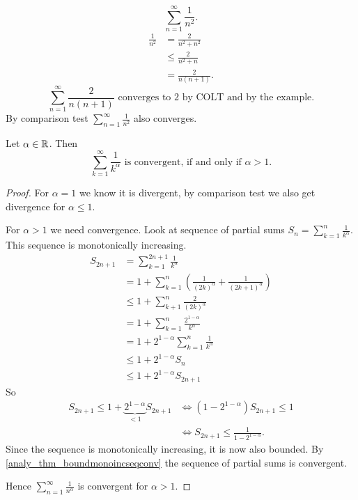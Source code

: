 \documentclass[10pt, a4paper]{article}
\newcommand{\infsum}[1][k = 1]{\sum_{#1}^{\infty}}
\begin{document}
\begin{example}
    \[
    \infsum[n = 1]\frac{1}{n ^ 2}.
    \]
    \begin{align*}
        \frac{1}{n ^ 2} &= \frac{2}{n ^ 2 + n ^ 2} \\
        &\leq \frac{2}{n ^ 2 + n} \\
        &= \frac{2}{n(n + 1)}.
    \end{align*}
    \[
    \infsum[n = 1]\frac{2}{n(n + 1)}\text{ converges to $2$ by COLT and by the example}.
    \]
    By comparison test $\infsum[n = 1]\frac{1}{n ^ 2}$ also converges.
\end{example}

\begin{theorem}
    Let $\alpha \in \mathbb{R}$.
    Then
    \[
    \infsum\frac{1}{k ^ \alpha}\text{ is convergent, if and only if $\alpha > 1$}.
    \]
    \begin{proof}
        For $\alpha = 1$ we know it is divergent,
        by comparison test we also get divergence for $\alpha \leq 1$.

        For $\alpha > 1$ we need convergence.
        Look at sequence of partial sums $\displaystyle S_n = \sum_{k = 1}^{n}\frac{1}{k ^ \alpha}$.
        This sequence is monotonically increasing.
        \begin{align*}
            S_{2n + 1} &= \sum_{k = 1}^{2n + 1}\frac{1}{k ^ \alpha} \\
            &= 1 + \sum_{k = 1}^{n}\left(\frac{1}{(2k) ^ \alpha} + \frac{1}{(2k + 1) ^ \alpha}\right) \\
            &\leq 1 + \sum_{k + 1}^{n}\frac{2}{(2k) ^ \alpha} \\
            &= 1 + \sum_{k = 1}^{n}\frac{2 ^ {1 - \alpha}}{k ^ \alpha} \\
            &= 1 + 2 ^ {1 - \alpha}\sum_{k = 1}^{n}\frac{1}{k ^ \alpha} \\
            &\leq 1 + 2 ^ {1 - \alpha}S_n \\
            &\leq 1 + 2 ^ {1 - \alpha}S_{2n + 1}
        \end{align*}
        So
        \begin{align*}
            S_{2n + 1} \leq 1 + \underbrace{2 ^ {1 - \alpha}}_{< 1}S_{2n + 1} &\iff (1 - 2 ^ {1 - \alpha})S_{2n + 1} \leq 1 \\
            &\iff S_{2n + 1} \leq \frac{1}{1 - 2 ^ {1 - \alpha}}.
        \end{align*}
        Since the sequence is monotonically increasing,
        it is now also bounded.
        By \autoref{analy_thm_boundmonoincseqconv} the sequence of partial sums is convergent.
        
        Hence $\displaystyle\infsum[n = 1]\frac{1}{n ^ \alpha}$ is convergent for $\alpha > 1$.
    \end{proof}
\end{theorem}
\end{document}
